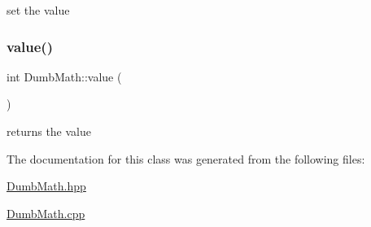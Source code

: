 set the value 

\mbox{\label{classbasic_lib_1_1_dumb_math_aa2e0180126b6f246d28da2d224f151b1}} 
\subsubsection{\texorpdfstring{value()}{value()}}
{\footnotesize\ttfamily int Dumb\+Math\+::value (\begin{DoxyParamCaption}{ }\end{DoxyParamCaption})}



returns the value 



The documentation for this class was generated from the following files\+:\begin{DoxyCompactItemize}
\item 
\hyperlink{_dumb_math_8hpp}{Dumb\+Math.\+hpp}\item 
\hyperlink{_dumb_math_8cpp}{Dumb\+Math.\+cpp}\end{DoxyCompactItemize}
